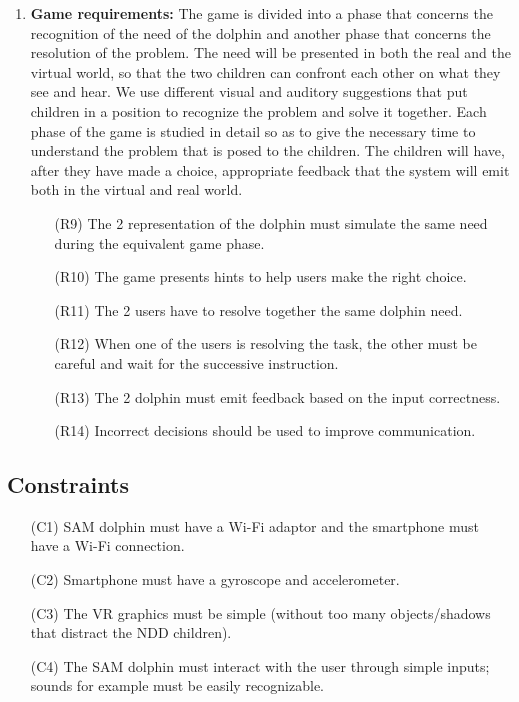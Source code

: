 \documentclass [12pt]{article}
\begin{document}
\begin{enumerate}
\begin{itemize}
\end{itemize}

\item \textbf{Game requirements:}
The game is divided into a phase that concerns the recognition of the need of the dolphin and another phase that concerns the resolution of the problem. The need will be presented in both the real and the virtual world, so that the two children can confront each other on what they see and hear. We use different visual and auditory suggestions that put children in a position to recognize the problem and solve it together. Each phase of the game is studied in detail so as to give the necessary time to understand the problem that is posed to the children. The children will have, after they have made a choice, appropriate feedback that the system will emit both in the virtual and real world.
\begin{itemize}
\item [(R9)] The 2 representation of the dolphin must simulate the same need during the equivalent game phase.
\item [(R10)] The game presents hints to help users make the right choice. 
\item [(R11)] The 2 users have to resolve together the same dolphin need.
\item [(R12)] When one of the users is resolving the task, the other must be careful and wait for the successive instruction.
\item [(R13)] The 2 dolphin must emit feedback based on the input correctness.
\item [(R14)] Incorrect decisions should be used to improve communication.

\end{itemize}

\end{enumerate}
\subsection{Constraints}
\begin{itemize}
\item [(C1)] SAM dolphin must have a Wi-Fi adaptor and the smartphone must have a Wi-Fi connection.
\item [(C2)] Smartphone must have a gyroscope and accelerometer.
\item [(C3)] The VR graphics must be simple (without too many objects/shadows that distract the NDD children).
\item [(C4)] The SAM dolphin must interact with the user through simple inputs; sounds for example must be easily recognizable.
\end{itemize}
\end{document}
